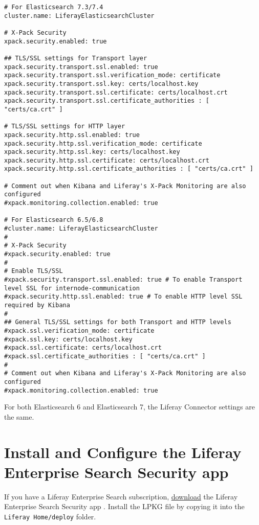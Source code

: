 \begin{verbatim}
# For Elasticsearch 7.3/7.4
cluster.name: LiferayElasticsearchCluster

# X-Pack Security
xpack.security.enabled: true

## TLS/SSL settings for Transport layer
xpack.security.transport.ssl.enabled: true
xpack.security.transport.ssl.verification_mode: certificate 
xpack.security.transport.ssl.key: certs/localhost.key
xpack.security.transport.ssl.certificate: certs/localhost.crt
xpack.security.transport.ssl.certificate_authorities : [ "certs/ca.crt" ]

# TLS/SSL settings for HTTP layer
xpack.security.http.ssl.enabled: true
xpack.security.http.ssl.verification_mode: certificate 
xpack.security.http.ssl.key: certs/localhost.key
xpack.security.http.ssl.certificate: certs/localhost.crt
xpack.security.http.ssl.certificate_authorities : [ "certs/ca.crt" ]

# Comment out when Kibana and Liferay's X-Pack Monitoring are also configured
#xpack.monitoring.collection.enabled: true

# For Elasticsearch 6.5/6.8
#cluster.name: LiferayElasticsearchCluster
#
# X-Pack Security
#xpack.security.enabled: true
#
# Enable TLS/SSL
#xpack.security.transport.ssl.enabled: true # To enable Transport level SSL for internode-communication
#xpack.security.http.ssl.enabled: true # To enable HTTP level SSL required by Kibana
#
## General TLS/SSL settings for both Transport and HTTP levels
#xpack.ssl.verification_mode: certificate 
#xpack.ssl.key: certs/localhost.key
#xpack.ssl.certificate: certs/localhost.crt
#xpack.ssl.certificate_authorities : [ "certs/ca.crt" ]
#
# Comment out when Kibana and Liferay's X-Pack Monitoring are also configured
#xpack.monitoring.collection.enabled: true
\end{verbatim}

For both Elasticsearch 6 and Elasticsearch 7, the Liferay Connector
settings are the same.

\section{Install and Configure the Liferay Enterprise Search Security
app}\label{install-and-configure-the-liferay-enterprise-search-security-app}

If you have a Liferay Enterprise Search subscription,
\href{https://web.liferay.com/group/customer/dxp/downloads/enterprise-search}{download}
the Liferay Enterprise Search Security app . Install the LPKG file by
copying it into the \texttt{Liferay\ Home/deploy} folder.

